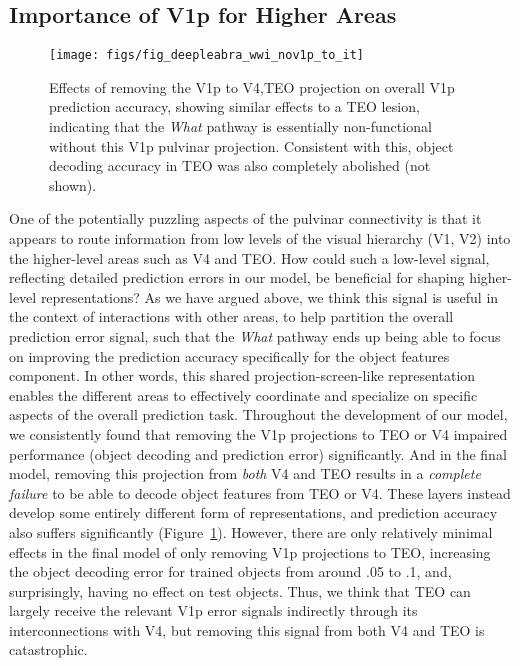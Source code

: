 \documentclass[11pt,twoside]{article}
\newif\myifpdf
\begin{document}
\subsection{Importance of V1p for Higher Areas}

\begin{figure}
  \centering\texttt{[image: figs/fig\_deepleabra\_wwi\_nov1p\_to\_it]}
  \caption{\footnotesize Effects of removing the V1p to V4,TEO projection on overall V1p prediction accuracy, showing similar effects to a TEO lesion, indicating that the {\em What} pathway is essentially non-functional without this V1p pulvinar projection.  Consistent with this, object decoding accuracy in TEO was also completely abolished (not shown).}
  \label{fig.nov1p_to_it}
\end{figure}

One of the potentially puzzling aspects of the pulvinar connectivity is that it appears to route information from low levels of the visual hierarchy (V1, V2) into the higher-level areas such as V4 and TEO.  How could such a low-level signal, reflecting detailed prediction errors in our model, be beneficial for shaping higher-level representations?  As we have argued above, we think this signal is useful in the context of interactions with other areas, to help partition the overall prediction error signal, such that the {\em What} pathway ends up being able to focus on improving the prediction accuracy specifically for the object features component.  In other words, this shared projection-screen-like representation enables the different areas to effectively coordinate and specialize on specific aspects of the overall prediction task.  Throughout the development of our model, we consistently found that removing the V1p projections to TEO or V4 impaired performance (object decoding and prediction error) significantly.  And in the final model, removing this projection from {\em both} V4 and TEO results in a {\em complete failure} to be able to decode object features from TEO or V4.  These layers instead develop some entirely different form of representations, and prediction accuracy also suffers significantly (Figure~\ref{fig.nov1p_to_it}).  However, there are only relatively minimal effects in the final model of only removing V1p projections to TEO, increasing the object decoding error for trained objects from around .05 to .1, and, surprisingly, having no effect on test objects.  Thus, we think that TEO can largely receive the relevant V1p error signals indirectly through its interconnections with V4, but removing this signal from both V4 and TEO is catastrophic.
\end{document}
